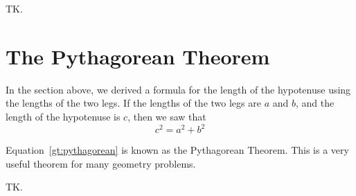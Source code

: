 \documentclass[a4paper,10pt]{report}
\begin{document}
TK.

\section{The Pythagorean Theorem}

In the section above, we derived a formula for the length of the hypotenuse
using the lengths of the two legs. If the lengths of the two legs are \(a\) and
\(b\), and the length of the hypotenuse is \(c\), then we saw that
\begin{equation}
  \label{gt:pythagorean}
  c^2 = a^2 + b^2
\end{equation}

Equation~\ref{gt:pythagorean} is known as the Pythagorean Theorem. This is a
very useful theorem for many geometry problems.

TK.


\printglossaries

\cleardoublepage
{}
\listoffigures
\end{document}

